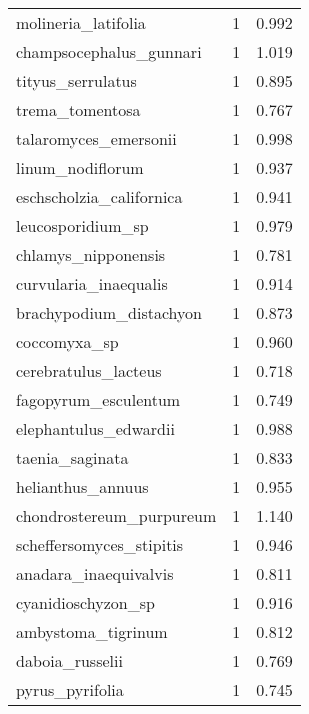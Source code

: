 \begin{tabular}{lrr}
            molineria\_latifolia &                   1 &     0.992 \\
        champsocephalus\_gunnari &                   1 &     1.019 \\
              tityus\_serrulatus &                   1 &     0.895 \\
                trema\_tomentosa &                   1 &     0.767 \\
          talaromyces\_emersonii &                   1 &     0.998 \\
               linum\_nodiflorum &                   1 &     0.937 \\
       eschscholzia\_californica &                   1 &     0.941 \\
              leucosporidium\_sp &                   1 &     0.979 \\
            chlamys\_nipponensis &                   1 &     0.781 \\
          curvularia\_inaequalis &                   1 &     0.914 \\
        brachypodium\_distachyon &                   1 &     0.873 \\
                   coccomyxa\_sp &                   1 &     0.960 \\
           cerebratulus\_lacteus &                   1 &     0.718 \\
           fagopyrum\_esculentum &                   1 &     0.749 \\
          elephantulus\_edwardii &                   1 &     0.988 \\
                taenia\_saginata &                   1 &     0.833 \\
              helianthus\_annuus &                   1 &     0.955 \\
       chondrostereum\_purpureum &                   1 &     1.140 \\
       scheffersomyces\_stipitis &                   1 &     0.946 \\
          anadara\_inaequivalvis &                   1 &     0.811 \\
             cyanidioschyzon\_sp &                   1 &     0.916 \\
             ambystoma\_tigrinum &                   1 &     0.812 \\
                daboia\_russelii &                   1 &     0.769 \\
                pyrus\_pyrifolia &                   1 &     0.745 \\

\end{tabular}
